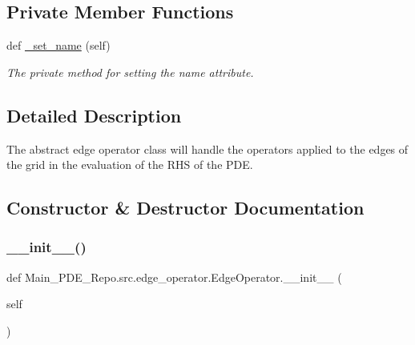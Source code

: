 \subsection*{Private Member Functions}
\begin{DoxyCompactItemize}
\item 
def \hyperlink{classMain__PDE__Repo_1_1src_1_1edge__operator_1_1EdgeOperator_a508247a7337a44a64100d8dc099a99c3}{\+\_\+set\+\_\+name} (self)
\begin{DoxyCompactList}\small\item\em The private method for setting the name attribute. \end{DoxyCompactList}\end{DoxyCompactItemize}


\subsection{Detailed Description}
The abstract edge operator class will handle the operators applied to the edges of the grid in the evaluation of the R\+HS of the P\+DE. 



\subsection{Constructor \& Destructor Documentation}
\mbox{\label{classMain__PDE__Repo_1_1src_1_1edge__operator_1_1EdgeOperator_a8b441be8ab71393470f0f3e3d983889c}} 
\subsubsection{\texorpdfstring{\+\_\+\+\_\+init\+\_\+\+\_\+()}{\_\_init\_\_()}}
{\footnotesize\ttfamily def Main\+\_\+\+P\+D\+E\+\_\+\+Repo.\+src.\+edge\+\_\+operator.\+Edge\+Operator.\+\_\+\+\_\+init\+\_\+\+\_\+ (\begin{DoxyParamCaption}\item[{}]{self }\end{DoxyParamCaption})}



